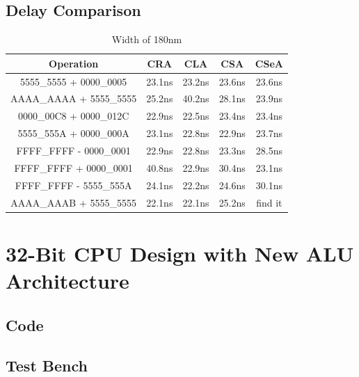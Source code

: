 \documentclass[12pt]{article}
\begin{document}
\subsection{Delay Comparison}

\begin{table}[H]
	\begin{center}
		\begin{tabular}{ |c|c|c|c|c| }
			\hline
			Operation & CRA & CLA & CSA & CSeA \\

			\hline
			5555\_5555 + 0000\_0005 & 23.1ns & 23.2ns & 23.6ns & 23.6ns \\
			\hline
			AAAA\_AAAA + 5555\_5555 & 25.2ns & 40.2ns& 28.1ns& 23.9ns \\
			\hline
			0000\_00C8 + 0000\_012C & 22.9ns & 22.5ns &  23.4ns& 23.4ns \\
			\hline
			5555\_555A + 0000\_000A & 23.1ns & 22.8ns & 22.9ns & 23.7ns \\
			\hline
			FFFF\_FFFF - 0000\_0001 & 22.9ns & 22.8ns & 23.3ns & 28.5ns \\
			\hline
			FFFF\_FFFF + 0000\_0001 & 40.8ns & 22.9ns & 30.4ns & 23.1ns \\
			\hline
			FFFF\_FFFF - 5555\_555A & 24.1ns & 22.2ns & 24.6ns & 30.1ns \\
			\hline
			AAAA\_AAAB + 5555\_5555 & 22.1ns & 22.1ns & 25.2ns & find it \\
			\hline
		\end{tabular}
	\end{center}
	\caption{Width of 180nm}
	\label{tab:2nd}
\end{table}


\section{32-Bit CPU Design with New ALU Architecture}
\subsection{Code}


\subsection{Test Bench}
\end{document}
